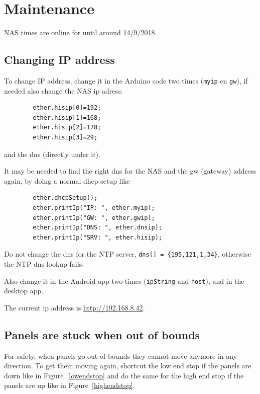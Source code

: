 \documentclass{article}
\newcommand{\ipaddress}{http://192.168.8.42}
\begin{document}
    \tableofcontents
    \newpage

    \section{Maintenance}\label{sec:maintenance}
    NAS times are online for until around 14/9/2018.

    \subsection{Changing IP address}\label{subsec:changingIpAddress}

    To change IP address, change it in the Arduino code two times (\verb|myip| en \verb|gw|), if needed also change the NAS ip adress:
    \begin{lstlisting}
        ether.hisip[0]=192;
        ether.hisip[1]=168;
        ether.hisip[2]=178;
        ether.hisip[3]=29;
    \end{lstlisting}
    and the dns (directly under it).

    It may be needed to find the right dns for the NAS and the gw (gateway) address again, by doing a normal dhcp setup like
    \begin{lstlisting}
        ether.dhcpSetup();
        ether.printIp("IP: ", ether.myip);
        ether.printIp("GW: ", ether.gwip);
        ether.printIp("DNS: ", ether.dnsip);
        ether.printIp("SRV: ", ether.hisip);
    \end{lstlisting}
    Do not change the dns for the NTP server, \verb|dns[] = {195,121,1,34}|, otherwise the NTP dns lookup fails.

    Also change it in the Android app two times (\verb|ipString| and \verb|host|), and in the desktop app.

    The current ip address is \url{\ipaddress}.

    \subsection{Panels are stuck when out of bounds}\label{subsec:outOfBounds}

    For safety, when panels go out of bounds they cannot move anymore in any direction.
    To get them moving again, shortcut the low end stop if the panels are down like in Figure~\ref{lowendstop} and do the same for the high end stop if the panels are up like in Figure~\ref{highendstop}.
\end{document}
